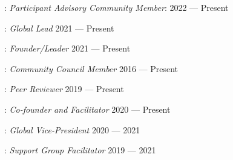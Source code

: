 : \textit{Participant Advisory Community Member}:
\hfill 2022 --- Present

: \textit{Global Lead}
\hfill 2021 --- Present

: \textit{Founder/Leader} \hfill 2021 --- Present

:
\textit{Community Council Member} \hfill 2016 --- Present

: \textit{Peer
	Reviewer} \hfill 2019 --- Present

: \textit{Co-founder and Facilitator}
\hfill 2020 --- Present

: \textit{Global Vice-President}
\hfill 2020 --- 2021

: \textit{Support Group Facilitator}
\hfill 2019 --- 2021

